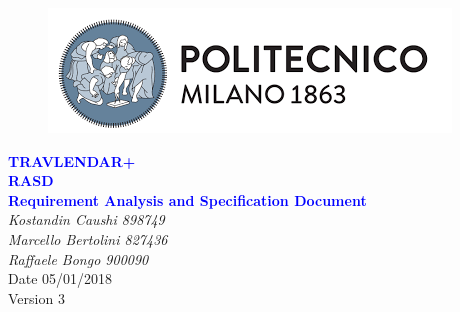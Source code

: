


	\begin{titlepage}
		\centering
		\begin{figure}
			\vspace*{0mm}
			\centering
			\includegraphics[scale=0.7]{Images/Polimi_Logo}
			\\[3cm]
		\end{figure}		
		\vspace{65mm}
		\textcolor{Blue}{\textbf{\Huge TRAVLENDAR+}}\\[15mm]
		\textcolor{Blue}{\textbf{\huge RASD}}\\[4mm]
		{\textcolor{Blue}{\textbf{\Large{Requirement Analysis and Specification Document}}}}\\
		\vspace{30mm}
		\textit{\large Kostandin Caushi 898749}\\[3mm]
		\textit{\large Marcello Bertolini 827436}\\[3mm]
		\textit{\large Raffaele Bongo 900090}\\[3mm]
		\vspace{30mm}
		Date 05/01/2018\\
		\vspace{10mm}
		Version 3
	\end{titlepage}

	\begin{center}
	\vspace*{-5mm}
	\renewcommand{\contentsname}{Table of Contents}
	\tableofcontents
	\newpage
	\listoffigures
	\newpage
    \end{center}
	
	\ttfamily
	\setlength{\emergencystretch}{45pt}
	
	\newpage
	
	\newpage
	
	\newpage
	
	\newpage
	
	\newpage
	

